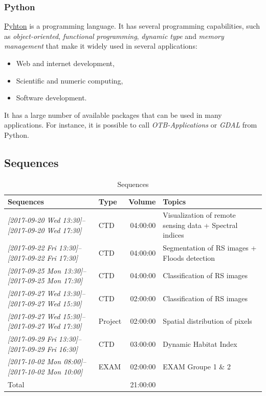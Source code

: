 \documentclass[a4paper,11pt,DIV=18]{scrartcl}
\begin{document}
\subsubsection{Python}
\label{sec:org087e57f}
\href{https://www.python.org/}{Pyhton}  is   a  programming  language.  It   has  several  programming
capabilities, such as \emph{object-oriented}, \emph{functional programming}, \emph{dynamic
type}  and  \emph{memory management}  that  make  it  widely used  in  several
applications:
\begin{itemize}
\item Web and internet development,
\item Scientific and numeric computing,
\item Software development.
\end{itemize}
It has a large  number of available packages that can  be used in many
applications. For instance, it is possible to call \emph{OTB-Applications} or
\emph{GDAL} from Python.
\subsection{Sequences}
\label{sec:org922f354}

\begin{table}[htbp]
\caption{Sequences}
\centering
\begin{tabular}{llrl}
\toprule
Sequences & Type & Volume & Topics\\
\midrule
\textit{[2017-09-20 Wed 13:30]--[2017-09-20 Wed 17:30]} & CTD & 04:00:00 & Visualization of remote sensing data + Spectral indices\\
\textit{[2017-09-22 Fri 13:30]--[2017-09-22 Fri 17:30]} & CTD & 04:00:00 & Segmentation of RS images + Floods detection\\
\textit{[2017-09-25 Mon 13:30]--[2017-09-25 Mon 17:30]} & CTD & 04:00:00 & Classification of RS images\\
\textit{[2017-09-27 Wed 13:30]--[2017-09-27 Wed 15:30]} & CTD & 02:00:00 & Classification of RS images\\
\textit{[2017-09-27 Wed 15:30]--[2017-09-27 Wed 17:30]} & Project & 02:00:00 & Spatial distribution of pixels\\
\textit{[2017-09-29 Fri 13:30]--[2017-09-29 Fri 16:30]} & CTD & 03:00:00 & Dynamic Habitat Index\\
\textit{[2017-10-02 Mon 08:00]--[2017-10-02 Mon 10:00]} & EXAM & 02:00:00 & EXAM Groupe 1 \& 2\\
\midrule
Total &  & 21:00:00 & \\
\bottomrule
\end{tabular}
\end{table}
\end{document}
